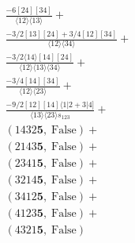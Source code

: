 \documentclass[varwidth, border=5pt]{standalone}
\begin{document}
\begin{my}
$\begin{gathered}
\scriptscriptstyle\frac{-6[24][34]}{⟨12⟩⟨13⟩} +\\
\scriptscriptstyle\frac{-3/2[13][24]+3/4[12][34]}{⟨12⟩⟨34⟩} +\\
\scriptscriptstyle\frac{-3/2⟨14⟩[14][24]}{⟨12⟩⟨13⟩⟨34⟩} +\\
\scriptscriptstyle\frac{-3/4[14][34]}{⟨12⟩⟨23⟩} +\\
\scriptscriptstyle\frac{-9/2[12][14]⟨1|2+3|4]}{⟨13⟩⟨23⟩s_{123}} +\\
\scriptscriptstyle(1432𝟓,\;\text{False}) +\\
\scriptscriptstyle(2143𝟓,\;\text{False}) +\\
\scriptscriptstyle(2341𝟓,\;\text{False}) +\\
\scriptscriptstyle(3214𝟓,\;\text{False}) +\\
\scriptscriptstyle(3412𝟓,\;\text{False}) +\\
\scriptscriptstyle(4123𝟓,\;\text{False}) +\\
\scriptscriptstyle(4321𝟓,\;\text{False}) \phantom{+}
\end{gathered}$
\end{my}
\end{document}

